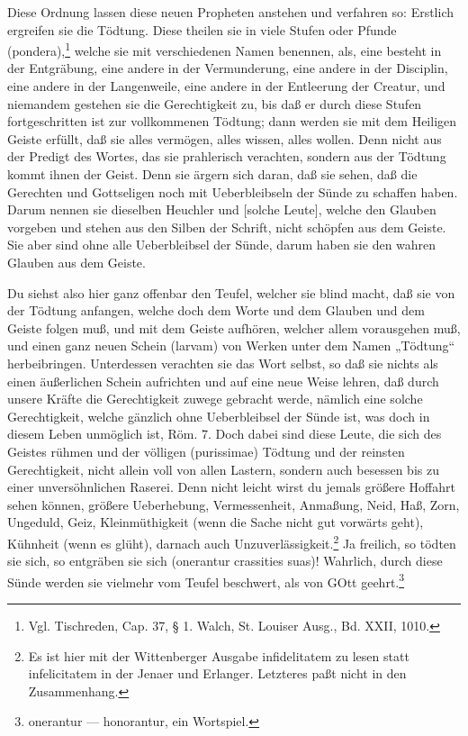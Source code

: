 Diese Ordnung lassen diese neuen Propheten anstehen und verfahren so: Erstlich ergreifen sie die Tödtung. Diese theilen sie in viele Stufen oder Pfunde (pondera),\footnote{Vgl. Tischreden, Cap. 37, § 1. Walch, St. Louiser Ausg., Bd. XXII, 1010.} welche sie mit verschiedenen Namen benennen, als, eine besteht in der Entgräbung, eine andere in der Vermunderung, eine andere in der Disciplin, eine andere in der Langenweile, eine andere in der Entleerung der Creatur, und niemandem gestehen sie die Gerechtigkeit zu, bis daß er durch diese Stufen fortgeschritten ist zur vollkommenen Tödtung; dann werden sie mit dem Heiligen Geiste erfüllt, daß sie alles vermögen, alles wissen, alles wollen. Denn nicht aus der Predigt des Wortes, das sie prahlerisch verachten, sondern aus der Tödtung kommt ihnen der Geist. Denn sie ärgern sich daran, daß sie sehen, daß die Gerechten und Gottseligen noch mit Ueberbleibseln der Sünde zu schaffen haben. Darum nennen sie dieselben Heuchler und [solche Leute], welche den Glauben vorgeben und stehen aus den Silben der Schrift, nicht schöpfen aus dem Geiste. Sie aber sind ohne alle Ueberbleibsel der Sünde, darum haben sie den wahren Glauben aus dem Geiste.

Du siehst also hier ganz offenbar den Teufel, welcher sie blind macht, daß sie von der Tödtung anfangen, welche doch dem Worte und dem Glauben und dem Geiste folgen muß, und mit dem Geiste aufhören, welcher allem vorausgehen muß, und einen ganz neuen Schein (larvam) von Werken unter dem Namen „Tödtung“ herbeibringen. Unterdessen verachten sie das Wort selbst, so daß sie nichts als einen äußerlichen Schein aufrichten und auf eine neue Weise lehren, daß durch unsere Kräfte die Gerechtigkeit zuwege gebracht werde, nämlich eine solche Gerechtigkeit, welche gänzlich ohne Ueberbleibsel der Sünde ist, was doch in diesem Leben unmöglich ist, Röm. 7. Doch dabei sind diese Leute, die sich des Geistes rühmen und der völligen (purissimae) Tödtung und der reinsten Gerechtigkeit, nicht allein voll von allen Lastern, sondern auch besessen bis zu einer unversöhnlichen Raserei. Denn nicht leicht wirst du jemals größere Hoffahrt sehen können, größere Ueberhebung, Vermessenheit, Anmaßung, Neid, Haß, Zorn, Ungeduld, Geiz, Kleinmüthigkeit (wenn die Sache nicht gut vorwärts geht), Kühnheit
(wenn es glüht), darnach auch Unzuverlässigkeit.\footnote{Es ist hier mit der Wittenberger Ausgabe infidelitatem zu lesen statt infelicitatem in der Jenaer und Erlanger. Letzteres paßt nicht in den Zusammenhang.} Ja freilich, so tödten sie sich, so entgräben sie sich (onerantur crassities suas)! Wahrlich, durch diese Sünde werden sie vielmehr vom Teufel beschwert, als von GOtt geehrt.\footnote{onerantur — honorantur, ein Wortspiel.}

